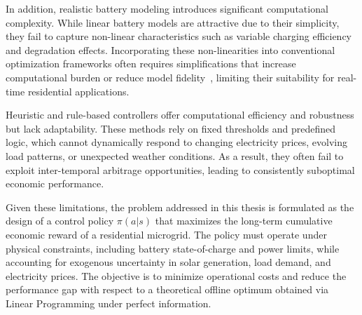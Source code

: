 In addition, realistic battery modeling introduces significant computational complexity. While linear battery models are attractive due to their simplicity, they fail to capture non-linear characteristics such as variable charging efficiency and degradation effects. Incorporating these non-linearities into conventional optimization frameworks often requires simplifications that increase computational burden or reduce model fidelity~\cite{Xu2016}, limiting their suitability for real-time residential applications.

Heuristic and rule-based controllers offer computational efficiency and robustness but lack adaptability. These methods rely on fixed thresholds and predefined logic, which cannot dynamically respond to changing electricity prices, evolving load patterns, or unexpected weather conditions. As a result, they often fail to exploit inter-temporal arbitrage opportunities, leading to consistently suboptimal economic performance.

Given these limitations, the problem addressed in this thesis is formulated as the design of a control policy $\pi(a|s)$ that maximizes the long-term cumulative economic reward of a residential microgrid. The policy must operate under physical constraints, including battery state-of-charge and power limits, while accounting for exogenous uncertainty in solar generation, load demand, and electricity prices. The objective is to minimize operational costs and reduce the performance gap with respect to a theoretical offline optimum obtained via Linear Programming under perfect information.
